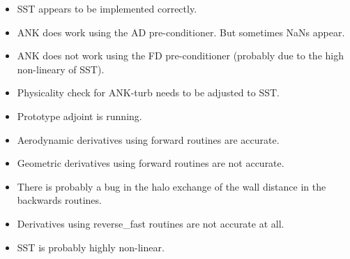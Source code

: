 \begin{itemize}
    \item SST appears to be implemented correctly.

    \item ANK does work using the AD pre-conditioner. But sometimes NaNs appear.

    \item ANK does not work using the FD pre-conditioner (probably due to the
        high non-lineary of SST).

    \item Physicality check for ANK-turb needs to be adjusted to SST.

    \item Prototype adjoint is running.

    \item Aerodynamic derivatives using forward routines are accurate.

    \item Geometric derivatives using forward routines are not accurate.

    \item There is probably a bug in the halo exchange of the wall distance in
        the backwards routines.

    \item Derivatives using reverse\_fast routines are not accurate at all.

    \item SST is probably highly non-linear.
\end{itemize}
